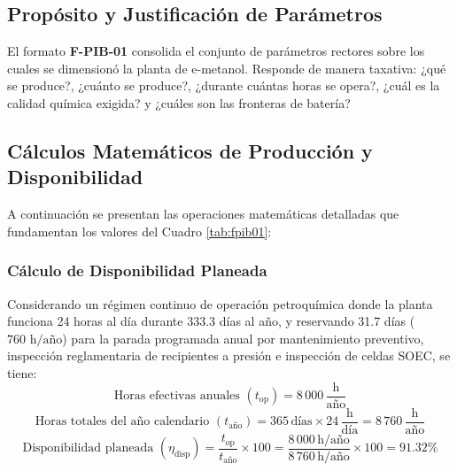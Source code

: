 \documentclass[10pt,letterpaper]{article}
\begin{document}
\subsection{Propósito y Justificación de Parámetros}
El formato \textbf{F-PIB-01} consolida el conjunto de parámetros rectores sobre los cuales se dimensionó la planta de e-metanol. Responde de manera taxativa: ¿qué se produce?, ¿cuánto se produce?, ¿durante cuántas horas se opera?, ¿cuál es la calidad química exigida? y ¿cuáles son las fronteras de batería?

\subsection{Cálculos Matemáticos de Producción y Disponibilidad}
A continuación se presentan las operaciones matemáticas detalladas que fundamentan los valores del Cuadro \ref{tab:fpib01}:

\subsubsection{Cálculo de Disponibilidad Planeada}
Considerando un régimen continuo de operación petroquímica donde la planta funciona 24 horas al día durante 333.3 días al año, y reservando 31.7 días ($760\text{ h/año}$) para la parada programada anual por mantenimiento preventivo, inspección reglamentaria de recipientes a presión e inspección de celdas SOEC, se tiene:
\begin{equation}
\text{Horas efectivas anuales } (t_{\text{op}}) = 8\,000\,\frac{\text{h}}{\text{año}}
\end{equation}
\begin{equation}
\text{Horas totales del año calendario } (t_{\text{año}}) = 365\,\text{días} \times 24\,\frac{\text{h}}{\text{día}} = 8\,760\,\frac{\text{h}}{\text{año}}
\end{equation}
\begin{equation}
\text{Disponibilidad planeada } (\eta_{\text{disp}}) = \frac{t_{\text{op}}}{t_{\text{año}}} \times 100 = \frac{8\,000\,\text{h/año}}{8\,760\,\text{h/año}} \times 100 = \mathbf{91.32\%}
\end{equation}
\end{document}
